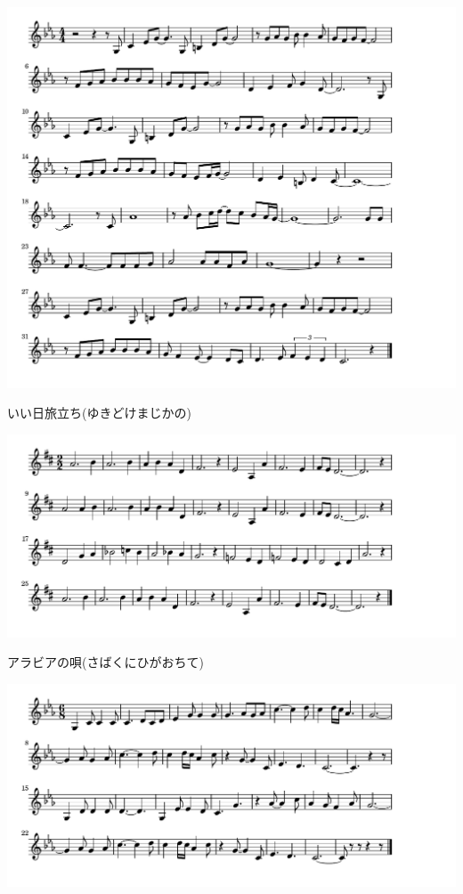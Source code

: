 \documentclass[a4paper]{ltjsarticle}
\begin{document}
\includegraphics[clip]{iihitabidachi_crop.pdf}

\vspace{-10mm} \hspace{10mm}
いい日旅立ち(ゆきどけまじかの)

\includegraphics[clip]{arabianouta_crop.pdf}

\vspace{-10mm} \hspace{10mm}
アラビアの唄(さばくにひがおちて)

\includegraphics[clip]{khabarovsk_crop.pdf}
\end{document}
